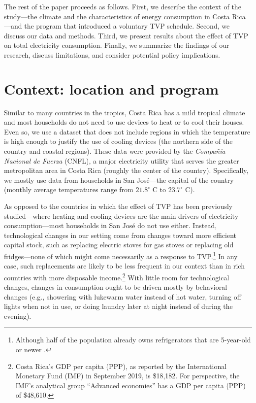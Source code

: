 \documentclass[12pt]{article}
\begin{document}
The rest of the paper proceeds as follows. First, we describe the context of the study---the climate and the characteristics of energy consumption in Costa Rica---and the program that introduced a voluntary TVP schedule. Second, we discuss our data and methods. Third, we present results about the effect of TVP on total electricity consumption. Finally, we summarize the findings of our research, discuss limitations, and consider potential policy implications.

\section{Context: location and program}

Similar to many countries in the tropics, Costa Rica has a mild tropical climate and most households do not need to use devices to heat or to cool their houses. Even so, we use a dataset that does not include regions in which the temperature is high enough to justify the use of cooling devices (the northern side of the country and coastal regions). These data were provided by the \emph{Compañía Nacional de Fuerza} (CNFL), a major electricity utility that serves the greater metropolitan area in Costa Rica (roughly the center of the country). Specifically, we mostly use data from households in San José---the capital of the country (monthly average temperatures range from $21.8 ^{\circ}$  C to $23.7^{\circ}$ C).

As opposed to the countries in which the effect of TVP has been previously studied---where heating and cooling devices are the main drivers of electricity consumption---most households in San José do not use either. Instead, technological changes in our setting come from changes toward more efficient capital stock, such as replacing electric stoves for gas stoves or replacing old fridges---none of which might come necessarily as a response to TVP.\footnote{ Although half of the population already owns refrigerators that are 5-year-old or newer \citep{ministeriodeambienteyenergiaEstudioParaCaracterizacion2019}.} In any case, such replacements are likely to be less frequent in our context than in rich countries with more disposable income.\footnote{Costa Rica’s GDP per capita (PPP), as reported by the International Monetary Fund (IMF) in September 2019, is \$18,182. For perspective, the IMF’s analytical group \enquote{Advanced economies} has a GDP per capita (PPP) of \$48,610.} With little room for technological changes, changes in consumption ought to be driven mostly by behavioral changes (e.g., showering with lukewarm water instead of hot water, turning off lights when not in use, or doing laundry later at night instead of during the evening).
\end{document}
